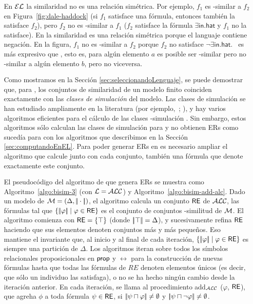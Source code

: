 En $\mathcal{EL}$ la similaridad no es una relaci\'on sim\'etrica. Por ejemplo, $f_1$ es \el-similar a $f_2$ en
Figura~\ref{fig:dale-haddock} (si $f_1$ satisface una f\'ormula, entonces tambi\'en la satisface $f_2$), pero $f_2$ no es \el-similar a $f_1$
($f_2$ satisface la f\'ormula $\exists \mathsf{in}.\mathsf{hat}$ y $f_1$
no la satisface). En \alc la similaridad es una relaci\'on sim\'etrica porque
el languaje contiene negaci\'on. En la figura, $f_1$ no es \alc-similar
a $f_2$ porque $f_2$ no satisface $\neg \exists
\mathsf{in}.\mathsf{hat}$. \alc\ es m\'as expresivo que \el,
esto es, para alg\'un elemento $a$ es posible ser \el-similar pero
no \alc-similar a alg\'un elemento $b$, pero no viceversa.

Como mostramos en la Secci\'on \ref{sec:seleccionandoLenguaje}, se puede demostrar que, para \ALC, los conjuntos de similaridad de un modelo finito
coinciden exactamente con las \emph{clases de simulaci\'on} del modelo. Las
clases de simulaci\'on se han estudiado ampliamente en la literatura
(por ejemplo,~\cite{BRV01}; \cite {Kurt:expr99}), y hay varios
algoritmos eficientes para el c\'alculo de las clases \alc-simulaci\'on
\cite{hopc:algo71,paig:thre87,dovier04:_effic_algor_for_comput_bisim_equiv}.
Sin embargo, estos algoritmos s\'olo calculan las clases de simulaci\'on para \alc y no obtienen ERs como suced\'ia para \EL con los algoritmos que describimos en la Secci\'on \ref{sec:computandoEnEL}. Para poder generar ERs en \alc es necesario ampliar el algoritmo \cite{hopc:algo71} que
calcule junto con cada conjunto, tambi\'en una f\'ormula que denote
exactamente este conjunto.
 
El pseudoc\'odigo del algoritmo de \ALC que genera ERs se muestra como
Algoritmo~\ref{algo:bisim-3} (con $\mathcal{L}=\mathcal{ALC}$) y
Algoritmo~\ref{algo:bisim-add-alc}. Dado un modelo de $\mathcal{M}=(\Delta,
|\!|\cdot|\!|)$, el algoritmo calcula un conjunto $\textsf{RE}$ de $\mathcal{ALC}$, las
f\'ormulas tal que $ \{|\!|\varphi|\!| \mid \varphi \in \textsf{RE} \} $ es el
conjunto de conjuntos \alc-similitud de $\mathcal{M}$. El algoritmo comienza con $ \textsf{RE}
= \{\top \} $ (donde $ |\!|\top|\!| = \Delta $), y sucesivamente refina
$\textsf{RE}$ haciendo que sus elementos denoten conjuntos m\'as y m\'as peque\~nos. Eso
mantiene el invariante que, al inicio y al final de cada iteraci\'on,
$\{|\!|\varphi|\!| \mid \varphi \in \textsf{RE}\}$ es siempre una partici\'on de
$ \Delta $. Los algoritmos iteran sobre todos los
s\'imbolos relacionales proposicionales en $ \mathsf{prop} $ y $\rel $ para la construcci\'on de nuevas f\'ormulas
hasta que todas las f\'ormulas de $RE$ denoten elementos \'unicos (es decir, que
s\'olo un individuo las satisfaga), o no se ha hecho ning\'un cambio desde la
 iteraci\'on anterior. En cada iteraci\'on, se llama al procedimiento
add$_\mathcal{ALC}$ ($ \varphi $, $\textsf{RE}$), que agreha $ \phi $ a toda
f\'ormula $\psi \in \textsf{RE} $, 
si $|\!|\psi \sqcap \varphi|\!| \not = \emptyset$ y $|\!|\psi \sqcap \neg \varphi|\!| \not = \emptyset$.

